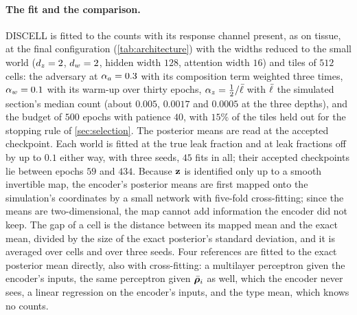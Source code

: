 \paragraph{The fit and the comparison.}
DISCELL is fitted to the counts with its response channel present, as on tissue, at the final configuration (\cref{tab:architecture}) with the widths reduced to the small world ($d_z = 2$, $d_w = 2$, hidden width $128$, attention width $16$) and tiles of $512$ cells: the adversary at $\alpha_a = 0.3$ with its composition term weighted three times, $\alpha_w = 0.1$ with its warm-up over thirty epochs, $\alpha_z = \tfrac12/\bar{\ell}$ with $\bar{\ell}$ the simulated section's median count (about $0.005$, $0.0017$ and $0.0005$ at the three depths), and the budget of $500$ epochs with patience $40$, with $15\%$ of the tiles held out for the stopping rule of \cref{sec:selection}. The posterior means are read at the accepted checkpoint. Each world is fitted at the true leak fraction and at leak fractions off by up to $0.1$ either way, with three seeds, $45$ fits in all; their accepted checkpoints lie between epochs $59$ and $434$. Because $\mathbf{z}$ is identified only up to a smooth invertible map, the encoder's posterior means are first mapped onto the simulation's coordinates by a small network with five-fold cross-fitting; since the means are two-dimensional, the map cannot add information the encoder did not keep. The gap of a cell is the distance between its mapped mean and the exact mean, divided by the size of the exact posterior's standard deviation, and it is averaged over cells and over three seeds. Four references are fitted to the exact posterior mean directly, also with cross-fitting: a multilayer perceptron given the encoder's inputs, the same perceptron given $\bar{\boldsymbol{\rho}}_i$ as well, which the encoder never sees, a linear regression on the encoder's inputs, and the type mean, which knows no counts.

